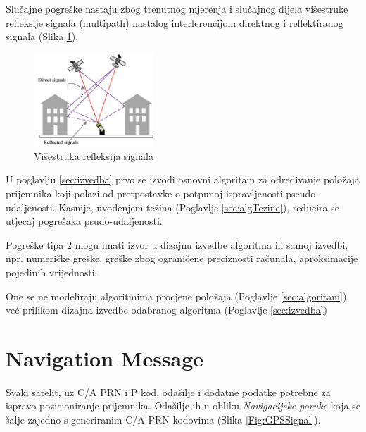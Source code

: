 \documentclass[a4paper,twoside,12pt]{memoir} %
\begin{document}
	Slučajne pogreške nastaju zbog trenutnog mjerenja i slučajnog dijela
	višestruke refleksije signala (multipath) nastalog interferencijom 
	direktnog i reflektiranog signala (Slika \ref{fig:multipath}).
	\begin{figure}[H]
		\centering
		\includegraphics[width=0.4\textwidth]{multipath}
		\caption{Višestruka refleksija signala}
		\label{fig:multipath}
	\end{figure}
	
	U poglavlju \ref{sec:izvedba} prvo se izvodi osnovni algoritam za određivanje položaja 
	prijemnika koji polazi od pretpostavke o potpunoj ispravljenosti pseudo-udaljenosti\label{stranica:greskaOvisisamoOxOpravdano}.
	Kasnije, uvođenjem težina (Poglavlje \ref{sec:algTezine}), reducira se utjecaj pogrešaka
	psudo-udaljenosti.
	
	\vspace{0.5cm}
	Pogreške tipa 2 mogu imati izvor u dizajnu izvedbe algoritma ili samoj izvedbi, npr.
	numeričke greške, greške zbog ograničene preciznosti računala,
	aproksimacije pojedinih vrijednosti.
	
	One se ne modeliraju algoritmima procjene položaja (Poglavlje \ref{sec:algoritam}), već prilikom dizajna izvedbe odabranog algoritma (Poglavlje \ref{sec:izvedba})
 	
	
	\section{Navigation Message}\label{sec:NM} %
	Svaki satelit, uz C/A PRN i P kod, odašilje i dodatne podatke potrebne za ispravo pozicioniranje prijemnika. Odašilje ih u obliku \textit{Navigacijske poruke} koja se šalje zajedno s generiranim C/A PRN kodovima (Slika \ref{Fig:GPSSignal}).
	
\end{document}
